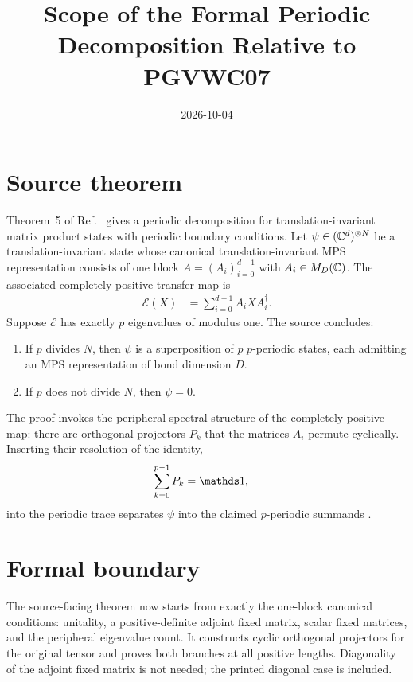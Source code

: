 \documentclass{article}
\title{Scope of the Formal Periodic Decomposition Relative to PGVWC07}
\author{}
\date{2026-10-04}
\begin{document}
\maketitle
{}

\section{Source theorem}

Theorem~5 of Ref.~\cite[lines~849--858]{PerezGarcia2007Matrix} gives a
periodic decomposition for translation-invariant matrix product states with
periodic boundary conditions. Let
$\psi\in(\mathbb{C}^d)^{\otimes N}$ be a translation-invariant state whose canonical
translation-invariant MPS representation consists of one block
$A=(A_i)_{i=0}^{d-1}$ with $A_i\in M_D(\mathbb{C})$. The associated completely
positive transfer map is
\begin{align}
    \mathcal E(X)
     & = \sum_{i=0}^{d-1} A_i X A_i^\dagger.
    \label{eq:pgvwc07_periodic_decomposition_scope_transfer_map}
\end{align}
Suppose $\mathcal E$ has exactly $p$ eigenvalues of modulus one. The source
concludes:
\begin{enumerate}
    \item If $p$ divides $N$, then $\psi$ is a superposition of $p$
          $p$-periodic states, each admitting an MPS representation of bond
          dimension $D$.
    \item If $p$ does not divide $N$, then $\psi=0$.
\end{enumerate}

The proof invokes the peripheral spectral structure of the completely positive
map: there are orthogonal projectors $P_k$ that the matrices $A_i$ permute
cyclically. Inserting their resolution of the identity,
\begin{align}
    \sum_{k=0}^{p-1}P_k
     & = \Id,
    \label{eq:pgvwc07_periodic_decomposition_scope_source_projector_resolution}
\end{align}
into the periodic trace separates $\psi$ into the claimed $p$-periodic
summands
\cite[lines~860--880]{PerezGarcia2007Matrix}.

\section{Formal boundary}

The source-facing theorem
 now starts from
exactly the one-block canonical conditions: unitality, a positive-definite
adjoint fixed matrix, scalar fixed matrices, and the peripheral eigenvalue
count. It constructs cyclic orthogonal projectors for the original tensor and
proves both branches at all positive lengths. Diagonality of the adjoint fixed
matrix is not needed; the printed diagonal case is included.
\end{document}
